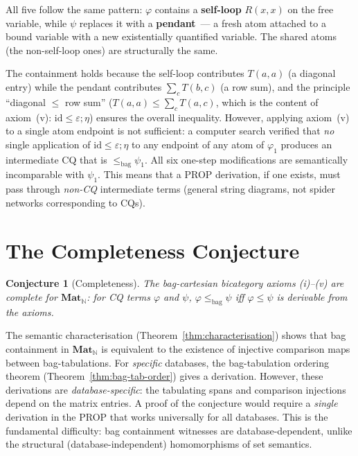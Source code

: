 \documentclass[11pt,a4paper]{article}
\newtheorem{conjecture}[theorem]{Conjecture}
\theoremstyle{definition}
\newcommand{\Mat}{\mathbf{Mat}}
\newcommand{\N}{\mathbb{N}}
\newcommand{\id}{\mathrm{id}}
\begin{document}
All five follow the same pattern: $\varphi$ contains a \textbf{self-loop} $R(x,x)$ on the free variable, while $\psi$ replaces it with a \textbf{pendant}~--- a fresh atom attached to a bound variable with a new existentially quantified variable. The shared atoms (the non-self-loop ones) are structurally the same.

The containment holds because the self-loop contributes $T(a,a)$ (a diagonal entry) while the pendant contributes $\sum_c T(b,c)$ (a row sum), and the principle ``diagonal $\leq$ row sum'' ($T(a,a) \leq \sum_c T(a,c)$, which is the content of axiom~(v): $\id \leq \varepsilon;\eta$) ensures the overall inequality. However, applying axiom~(v) to a single atom endpoint is not sufficient: a computer search verified that \emph{no} single application of $\id \leq \varepsilon;\eta$ to any endpoint of any atom of $\varphi_1$ produces an intermediate CQ that is $\leq_{\mathrm{bag}} \psi_1$. All six one-step modifications are semantically incomparable with $\psi_1$. This means that a PROP derivation, if one exists, must pass through \emph{non-CQ} intermediate terms (general string diagrams, not spider networks corresponding to CQs).

\section{The Completeness Conjecture}
\label{sec:conjecture}

\begin{conjecture}[Completeness]\label{conj:completeness}
The bag-cartesian bicategory axioms \textup{(i)--(v)} are complete for $\Mat_\N$: for CQ terms $\varphi$ and $\psi$, $\varphi \leq_{\mathrm{bag}} \psi$ iff $\varphi \leq \psi$ is derivable from the axioms.
\end{conjecture}

The semantic characterisation (Theorem~\ref{thm:characterisation}) shows that bag containment in $\Mat_\N$ is equivalent to the existence of injective comparison maps between bag-tabulations. For \emph{specific} databases, the bag-tabulation ordering theorem (Theorem~\ref{thm:bag-tab-order}) gives a derivation. However, these derivations are \emph{database-specific}: the tabulating spans and comparison injections depend on the matrix entries. A proof of the conjecture would require a \emph{single} derivation in the PROP that works universally for all databases. This is the fundamental difficulty: bag containment witnesses are database-dependent, unlike the structural (database-independent) homomorphisms of set semantics.
\end{document}
